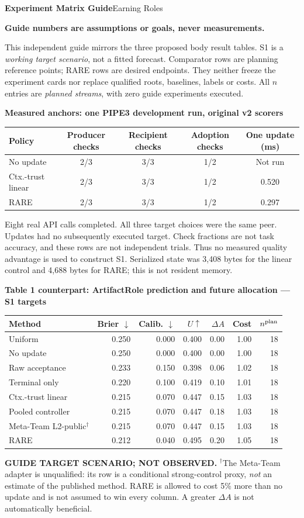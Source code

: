 \documentclass[10pt,a4paper]{article}
\newcommand{\status}{\textcolor{red!70!black}{\textbf{Guide numbers are assumptions or goals, never measurements.}}\par}
\newcommand{\lead}[1]{\vspace{4pt}\textbf{#1}\par}
\begin{document}
{\Large\bfseries Experiment Matrix Guide}\hfill{\small Earning Roles}
\par\status
This independent guide mirrors the three proposed body result tables. S1 is a
\emph{working target scenario}, not a fitted forecast. Comparator rows are
planning reference points; RARE rows are desired endpoints. They neither freeze
the experiment cards nor replace qualified roots, baselines, labels or costs.
All $n$ entries are \emph{planned streams}, with zero guide experiments executed.

\lead{Measured anchors: one PIPE3 development run, original v2 scorers}
\begin{center}\small
\begin{tabular}{@{}lcccc@{}}\toprule
Policy & Producer checks & Recipient checks & Adoption checks & One update (ms)\\\midrule
No update & 2/3 & 3/3 & 1/2 & Not run\\
Ctx.-trust linear & 2/3 & 3/3 & 1/2 & 0.520\\
RARE & 2/3 & 3/3 & 1/2 & 0.297\\\bottomrule
\end{tabular}\end{center}
Eight real API calls completed. All three target choices were the same peer.
Updates had no subsequently executed target. Check fractions are not task
accuracy, and these rows are not independent trials. Thus no measured quality
advantage is used to construct S1. Serialized state was 3,408 bytes for the
linear control and 4,688 bytes for RARE; this is not resident memory.

\lead{Table 1 counterpart: ArtifactRole prediction and future allocation --- S1 targets}
\begin{center}\small
\begin{tabular*}{\linewidth}{@{\extracolsep{\fill}}lrrrrrr@{}}\toprule
Method & Brier $\downarrow$ & Calib. $\downarrow$ & $U\uparrow$ & $\Delta A$ & Cost & $n^{\rm plan}$\\\midrule
Uniform & 0.250 & 0.000 & 0.400 & 0.00 & 1.00 & 18\\
No update & 0.250 & 0.000 & 0.400 & 0.00 & 1.00 & 18\\
Raw acceptance & 0.233 & 0.150 & 0.398 & 0.06 & 1.02 & 18\\
Terminal only & 0.220 & 0.100 & 0.419 & 0.10 & 1.01 & 18\\
Ctx.-trust linear & 0.215 & 0.070 & 0.447 & 0.15 & 1.03 & 18\\
Pooled controller & 0.215 & 0.070 & 0.447 & 0.18 & 1.03 & 18\\
Meta-Team L2-public$^{\dagger}$ & 0.215 & 0.070 & 0.447 & 0.15 & 1.03 & 18\\
RARE & 0.212 & 0.040 & 0.495 & 0.20 & 1.05 & 18\\
\bottomrule\end{tabular*}\end{center}
\textbf{GUIDE TARGET SCENARIO; NOT OBSERVED.} $^{\dagger}$The Meta-Team adapter is
unqualified: its row is a conditional strong-control proxy, \emph{not} an
estimate of the published method. RARE is allowed to cost 5\% more than no
update and is not assumed to win every column. A greater $\Delta A$ is not
automatically beneficial.
\end{document}
